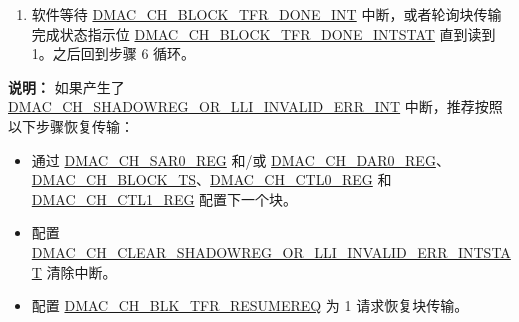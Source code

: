 \documentclass[main\_\_CN.tex]{subfiles}
\begin{document}
\begin{enumerate}
    \textbf{注意}：必须最后再将 \hyperref[fielddesc:DMACCHNSHADOWREGORLLIVALID]{DMAC\_CH\_SHADOWREG\_OR\_LLI\_VALID} 配置为 1。

    \item 软件等待 \hyperref[int:DMACCHNBLOCKTFRDONEINT]{DMAC\_CH\_BLOCK\_TFR\_DONE\_INT} 中断，或者轮询块传输完成状态指示位 \hyperref[fielddesc:DMACCHNBLOCKTFRDONEINTSTAT]{DMAC\_CH\_BLOCK\_TFR\_DONE\_INTSTAT} 直到读到 1。之后回到步骤 6 循环。


\end{enumerate}

\textbf{说明：}
如果产生了 \hyperref[int:DMACCHNSHADOWREGORLLIINVALIDERRINT]{DMAC\_CH\_SHADOWREG\_OR\_LLI\_INVALID\_ERR\_INT} 中断，推荐按照以下步骤恢复传输：

\begin{itemize}
    \item 通过 \hyperref[regdesc:DMACCHNSAR0REG]{DMAC\_CH\_SAR0\_REG} 和/或 \hyperref[regdesc:DMACCHNDAR0REG]{DMAC\_CH\_DAR0\_REG}、\hyperref[fielddesc:DMACCHNBLOCKTS]{DMAC\_CH\_BLOCK\_TS}、\hyperref[regdesc:DMACCHNCTL0REG]{DMAC\_CH\_CTL0\_REG} 和 \hyperref[regdesc:DMACCHNCTL1REG]{DMAC\_CH\_CTL1\_REG} 配置下一个块。
    \item 配置 \hyperref[fielddesc:DMACCHNCLEARSHADOWREGORLLIINVALIDERRINTSTAT] {DMAC\_CH\_CLEAR\_SHADOWREG\_OR\_LLI\_INVALID\_ERR\_INTSTAT} 清除中断。
    \item 配置 \hyperref[fielddesc:DMACCHNBLKTFRRESUMEREQ]{DMAC\_CH\_BLK\_TFR\_RESUMEREQ} 为 1 请求恢复块传输。
\end{itemize}
\end{document}
